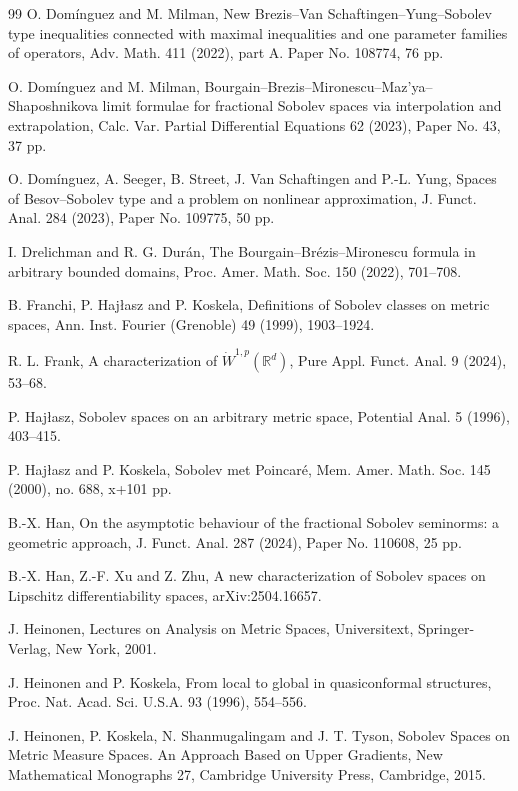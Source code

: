 \documentclass[11pt]{amsart}
\theoremstyle{definition}
\theoremstyle{remark}
\numberwithin{equation}{section}
\begin{document}
\begin{thebibliography}{99}
O. Dom\'inguez and M. Milman,
New Brezis--Van Schaftingen--Yung--Sobolev type inequalities connected with
maximal inequalities and one parameter families of operators,
Adv. Math. 411 (2022), part A. Paper No. 108774, 76 pp.


O. Dom\'inguez and M. Milman,
Bourgain--Brezis--Mironescu--Maz'ya--Shaposhnikova limit formulae for fractional Sobolev
spaces via interpolation and extrapolation,
Calc. Var. Partial Differential Equations 62 (2023), Paper No. 43, 37 pp.


O. Dom\'inguez, A. Seeger, B. Street, J. Van Schaftingen and P.-L. Yung,
Spaces of Besov--Sobolev type and a problem on nonlinear approximation,
J. Funct. Anal. 284 (2023), Paper No. 109775, 50 pp.


I. Drelichman and R. G. Dur\'an,
The Bourgain--Br\'ezis--Mironescu formula in arbitrary bounded domains,
Proc. Amer. Math. Soc. 150 (2022), 701--708.


B. Franchi, P. Haj\l asz and P. Koskela,
Definitions of Sobolev classes on metric spaces,
Ann. Inst. Fourier (Grenoble) 49 (1999), 1903--1924.


R. L. Frank,
A characterization of $\dot W^{1,p}(\mathbb R^d)$,
Pure Appl. Funct. Anal. 9 (2024), 53--68.


P. Haj\l asz,
Sobolev spaces on an arbitrary metric space,
Potential Anal. 5 (1996), 403--415.


P. Haj\l asz and P. Koskela,
Sobolev met Poincar\'e,
Mem. Amer. Math. Soc. 145 (2000), no. 688, x+101 pp.


B.-X. Han,
On the asymptotic behaviour of the fractional Sobolev seminorms: a geometric approach,
J. Funct. Anal. 287 (2024), Paper No. 110608, 25 pp.


B.-X. Han, Z.-F. Xu and Z. Zhu,
A new characterization of Sobolev spaces on Lipschitz differentiability spaces,
arXiv:2504.16657.


J. Heinonen,
Lectures on Analysis on Metric Spaces,
Universitext, Springer-Verlag, New York, 2001.


J. Heinonen and P. Koskela,
From local to global in quasiconformal structures,
Proc. Nat. Acad. Sci. U.S.A. 93 (1996), 554--556.


J. Heinonen, P. Koskela, N. Shanmugalingam and J. T. Tyson,
Sobolev Spaces on Metric Measure Spaces. An Approach Based on Upper Gradients,
New Mathematical Monographs 27, Cambridge University Press, Cambridge, 2015.



\end{thebibliography}
\end{document}

